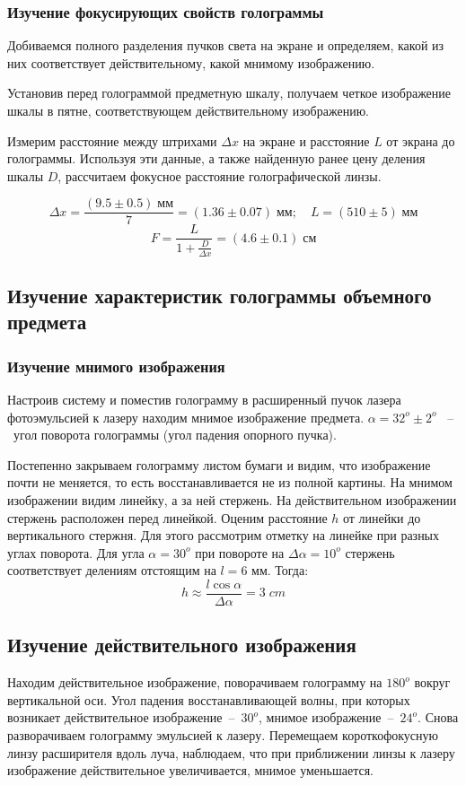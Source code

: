     \subsubsection*{Изучение фокусирующих свойств голограммы}

        Добиваемся полного разделения пучков света на экране и определяем, какой из них соответствует действительному, какой мнимому изображению. 

        Установив перед голограммой предметную шкалу, получаем четкое изображение шкалы в пятне, соответствующем действительному изображению.
        
         Измерим расстояние между штрихами $ \Delta x $ на экране и расстояние $L$ от экрана до голограммы. Используя эти данные, а также найденную ранее цену деления шкалы $D$, рассчитаем фокусное расстояние голографической линзы.
        
        \[ \Delta x = \frac{(9.5 \pm 0.5) \; мм}{7} = (1.36\pm 0.07) \; мм   ; \quad L = (510 \pm 5) \; мм \]
        \[ F = \dfrac{L}{1+\frac{D}{\Delta x}} = (4.6 \pm 0.1) \; см \]
        
\subsection{Изучение характеристик голограммы объемного предмета}
    \subsubsection*{Изучение мнимого изображения}
        
        \noindent Настроив систему и поместив голограмму в расширенный пучок лазера фотоэмульсией к лазеру находим мнимое изображение предмета. 
        $ \alpha = 32^o \pm 2^o $ ~--~угол поворота голограммы (угол падения опорного пучка).
        
        Постепенно закрываем голограмму листом бумаги и видим, что изображение почти не меняется, то есть восстанавливается не из полной картины.        
        На мнимом изображении видим линейку, а за ней стержень. На действительном изображении стержень расположен перед линейкой. 
        Оценим расстояние $h$ от линейки до вертикального стержня. Для этого рассмотрим отметку на линейке при разных углах поворота. Для угла $\alpha = 30^o$ при повороте на $\Delta \alpha =  10^o$ стержень соответствует делениям отстоящим на $l = 6$ мм. Тогда: \[h \approx \frac{l \cos \alpha}{\Delta \alpha} = 3 \; cm \]

    \subsection{Изучение действительного изображения}

        Находим действительное изображение, поворачиваем голограмму на $180^o$ вокруг вертикальной оси.
        Угол падения восстанавливающей волны, при которых возникает действительное изображение~--~$30^o$, мнимое изображение~--~$24^o$.
        Снова разворачиваем голограмму эмульсией к лазеру. Перемещаем короткофокусную линзу расширителя вдоль луча, наблюдаем, что при приближении линзы к лазеру изображение действительное увеличивается, мнимое уменьшается.
